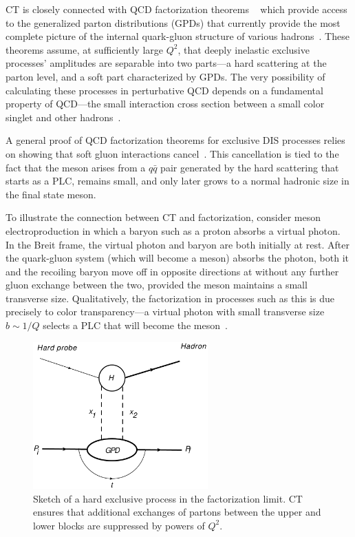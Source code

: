 CT is closely connected with QCD factorization
theorems ~\cite{Brodsky_1994, Collins_1997, Frankfurt_1999, Diehl_1998, Strikman_2000}
which provide access to the generalized parton distributions (GPDs)
that currently provide the most complete picture of the internal
quark-gluon structure of various hadrons~\cite{Ji_1997_Jan, Ji_1997_Jun,
Radyushkin_1996, Radyushkin_1997}.
These theorems assume, at sufficiently large $Q^2$, that deeply inelastic
exclusive processes' amplitudes are separable into two parts---a hard scattering
at the parton level, and a soft part characterized by GPDs.
The very possibility of calculating these processes in perturbative QCD depends
on a fundamental property of QCD---the small interaction cross section
between a small color singlet and other hadrons~\cite{Strikman_2000}.

A general proof of QCD factorization theorems for exclusive DIS processes
relies on showing that soft gluon interactions
cancel~\cite{Collins_1997, Collins_1998}.
This cancellation is tied to the fact that the meson arises from a $q\bar{q}$
pair generated by the hard scattering that starts as a PLC, remains small, and
only later grows to a normal hadronic size in the final state meson.

To illustrate the connection between CT and factorization, consider
meson electroproduction in which a baryon such as a proton absorbs a virtual
photon.
In the Breit frame, the virtual photon and baryon are both initially at rest.
After the quark-gluon system (which will become a meson) absorbs the photon,
both it and the recoiling baryon move off in opposite directions at without any
further gluon exchange between the two,
provided the meson maintains a small transverse size.
Qualitatively, the factorization in processes such as this is due precisely to
color transparency---a virtual photon with small transverse size $b\sim1/Q$
selects a PLC that will become the meson~\cite{Strikman_2000}.

\begin{figure}[H]
    \centering
    \includegraphics[width=0.6\textwidth]{chap2/factorization.pdf}
    \caption[Sketch of a hard exclusive process in the factorization limit.]{
            Sketch of a hard exclusive process in the factorization limit.
            CT ensures that additional exchanges of partons between the upper
            and lower blocks are suppressed by powers of $Q^2$.
    }
    \label{fig:factorization_handbag}
\end{figure}


